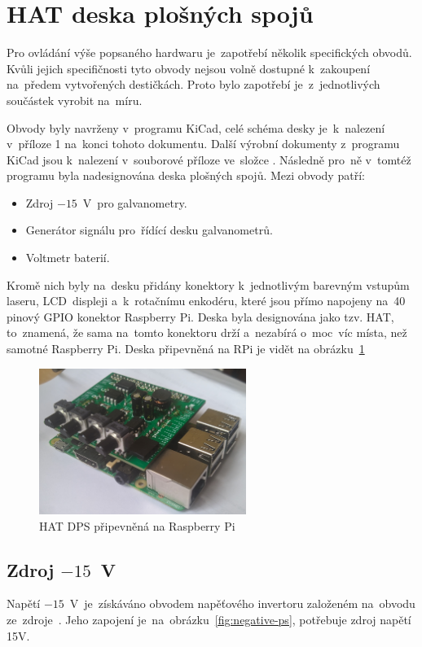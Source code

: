 \section{HAT deska plošných spojů}
Pro ovládání výše popsaného hardwaru je~zapotřebí několik specifických obvodů.
Kvůli jejich specifičnosti tyto obvody nejsou volně dostupné k~zakoupení na~předem vytvořených destičkách. Proto bylo zapotřebí je~z~jednotlivých součástek vyrobit na~míru.

Obvody byly navrženy v~programu KiCad, celé schéma desky je~k~nalezení v~příloze 1 na~konci tohoto dokumentu. Další výrobní dokumenty z~programu KiCad jsou k~nalezení v~souborové příloze ve~složce . Následně pro~ně v~tomtéž programu byla nadesignována deska plošných spojů. Mezi obvody patří:
\begin{itemize}
  \item Zdroj $-15$~V~pro galvanometry.
  \item Generátor signálu pro~řídící desku galvanometrů.
  \item Voltmetr baterií.
\end{itemize}

Kromě nich byly na~desku přidány konektory k~jednotlivým barevným vstupům laseru, LCD~displeji a~k~rotačnímu enkodéru, které jsou přímo napojeny na~40 pinový GPIO konektor Raspberry Pi.
Deska byla designována jako tzv. HAT, to~znamená, že sama na~tomto konektoru drží a~nezabírá o~moc~víc místa, než samotné Raspberry Pi. Deska připevněná na RPi je vidět na obrázku~\ref{fig:pcb-mounted}

\begin{figure}[htb]
  \centering
  \includegraphics[width=0.6\textwidth]{img/pcb-mounted.jpg}
  \caption{\label{fig:pcb-mounted} HAT DPS připevněná na Raspberry Pi }
\end{figure}

\subsection{Zdroj $-15$~V}\label{sec:negative-ps}
Napětí $-15$~V~je~získáváno obvodem napěťového invertoru založeném na~obvodu ze~zdroje~\cite{ampalyzer}. Jeho zapojení je~na~obrázku~\ref{fig:negative-ps}, potřebuje zdroj napětí 15V.

